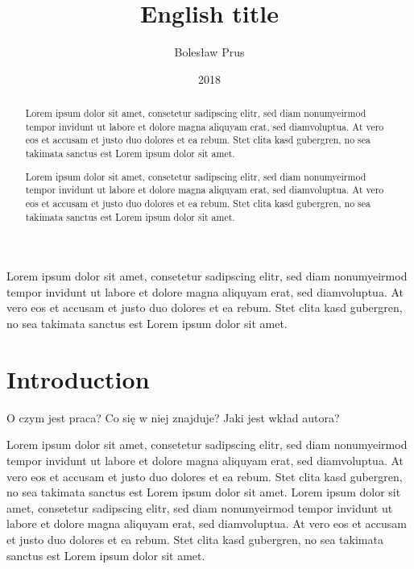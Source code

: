 \documentclass[en]{minipw} %
\title{English title} %
\author{Bolesław Prus}
\date{2018}
\begin{document}
\sloppy






\setcounter{page}{1}


\begin{streszczenie}

Lorem ipsum dolor sit amet, consetetur sadipscing elitr, sed diam nonumyeirmod tempor invidunt ut labore et dolore magna aliquyam erat, sed diamvoluptua. At vero eos et accusam et justo duo dolores et ea rebum. Stet clita kasd gubergren, no sea takimata sanctus est Lorem ipsum dolor sit amet.\\


\end{streszczenie}


\begin{abstract}

Lorem ipsum dolor sit amet, consetetur sadipscing elitr, sed diam nonumyeirmod tempor invidunt ut labore et dolore magna aliquyam erat, sed diamvoluptua. At vero eos et accusam et justo duo dolores et ea rebum. Stet clita kasd gubergren, no sea takimata sanctus est Lorem ipsum dolor sit amet.

Lorem ipsum dolor sit amet, consetetur sadipscing elitr, sed diam nonumyeirmod tempor invidunt ut labore et dolore magna aliquyam erat, sed diamvoluptua. At vero eos et accusam et justo duo dolores et ea rebum. Stet clita kasd gubergren, no sea takimata sanctus est Lorem ipsum dolor sit amet.\\

\end{abstract}

\makestatement


\cleardoublepage
\tableofcontents


\cleardoublepage
\pagestyle{fancy}

\chapter*{Introduction}

O czym jest praca? Co się w niej znajduje? Jaki jest wkład autora?

Lorem ipsum dolor sit amet, consetetur sadipscing elitr, sed diam nonumyeirmod tempor invidunt ut labore et dolore magna aliquyam erat, sed diamvoluptua. At vero eos et accusam et justo duo dolores et ea rebum. Stet clita kasd gubergren, no sea takimata sanctus est Lorem ipsum dolor sit amet. Lorem ipsum dolor sit amet, consetetur sadipscing elitr, sed diam nonumyeirmod tempor invidunt ut labore et dolore magna aliquyam erat, sed diamvoluptua. At vero eos et accusam et justo duo dolores et ea rebum. Stet clita kasd gubergren, no sea takimata sanctus est Lorem ipsum dolor sit amet.
\end{document}
